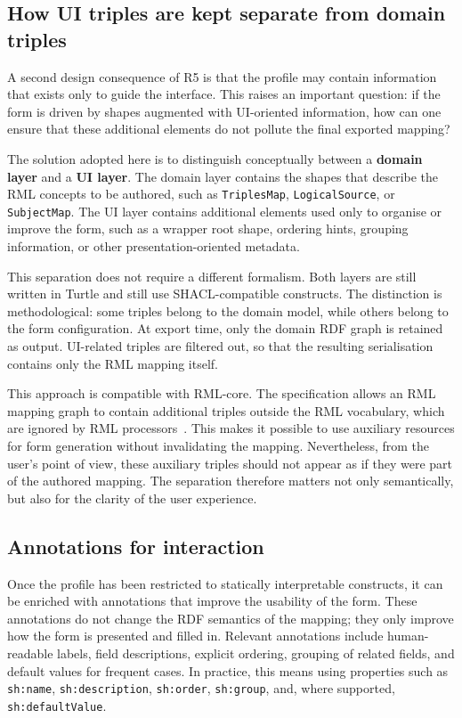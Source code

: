 \subsection{How UI triples are kept separate from domain triples}

A second design consequence of R5 is that the profile may contain information that exists only to guide the interface.
This raises an important question: if the form is driven by shapes augmented with UI-oriented information, how can one ensure that these additional elements do not pollute the final exported mapping?

The solution adopted here is to distinguish conceptually between a \textbf{domain layer} and a \textbf{UI layer}.
The domain layer contains the shapes that describe the RML concepts to be authored, such as \texttt{TriplesMap}, \texttt{LogicalSource}, or
\texttt{SubjectMap}.
The UI layer contains additional elements used only to organise or improve the form, such as a wrapper root shape, ordering hints, grouping information, or other presentation-oriented metadata.

This separation does not require a different formalism.
Both layers are still written in Turtle and still use SHACL-compatible constructs.
The distinction is methodological: some triples belong to the domain model, while others belong to the form configuration.
At export time, only the domain RDF graph is retained as output.
UI-related triples are filtered out, so that the resulting serialisation contains only the RML mapping itself.

This approach is compatible with RML-core.
The specification allows an RML mapping graph to contain additional triples outside the RML vocabulary, which are ignored by RML processors~\cite{kg:rmlcore}.
This makes it possible to use auxiliary resources for form generation without invalidating the mapping.
Nevertheless, from the user's point of view, these auxiliary triples should not appear as if they were part of the authored mapping.
The separation therefore matters not only semantically, but also for the clarity of the user experience.

\subsection{Annotations for interaction}

Once the profile has been restricted to statically interpretable constructs, it can be enriched with annotations that improve the usability of the form.
These annotations do not change the RDF semantics of the mapping; they only improve how the form is presented and filled in.
Relevant annotations include human-readable labels, field descriptions, explicit ordering, grouping of related fields, and default values for frequent cases.
In practice, this means using properties such as \texttt{sh:name}, \texttt{sh:description}, \texttt{sh:order}, \texttt{sh:group}, and, where
supported, \texttt{sh:defaultValue}.

